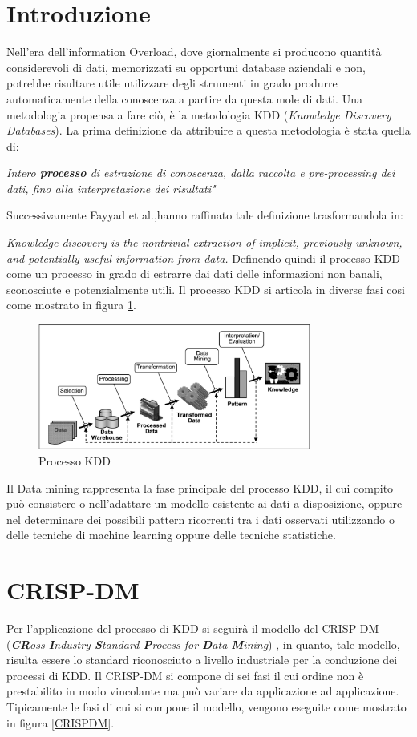 \section{Introduzione}
Nell'era dell'information Overload, dove giornalmente si producono quantità considerevoli di dati, memorizzati su opportuni database aziendali e non, potrebbe risultare utile utilizzare degli strumenti in grado produrre automaticamente della conoscenza a partire da questa mole di dati. Una metodologia propensa a fare ciò, è la metodologia KDD (\emph{Knowledge Discovery Databases}). 
La prima definizione da attribuire a questa metodologia è stata quella di:

\emph{Intero \textbf{processo} di estrazione di conoscenza, dalla raccolta e pre-processing dei dati, fino alla interpretazione dei risultati"\cite{DBLP:conf/kdd/1995}}


Successivamente Fayyad et al.,hanno raffinato tale definizione trasformandola in: 

\emph{Knowledge discovery is the nontrivial extraction of implicit, previously unknown, and potentially useful information from data.}
\cite{citeulike:1550195} Definendo quindi il processo KDD come un processo in grado di estrarre dai dati delle informazioni non banali, sconosciute e potenzialmente utili. Il processo KDD si articola in diverse fasi cosi come mostrato in figura \ref{kddprocess}.

\begin{figure}[hbtp]
\centering
\includegraphics[width=0.8\textwidth]{./images/kddprocess.png}
\caption{Processo KDD}
\label{kddprocess}
\end{figure}

Il Data mining rappresenta la fase principale del processo KDD, il cui compito può consistere o nell'adattare un modello esistente ai dati a disposizione, oppure nel determinare dei possibili pattern ricorrenti tra i dati osservati utilizzando o delle tecniche di machine learning oppure delle tecniche statistiche. 

\section{CRISP-DM}
Per l'applicazione del processo di KDD si seguirà il modello del CRISP-DM (\emph{\textbf{CR}oss \textbf{I}ndustry \textbf{S}tandard \textbf{P}rocess for \textbf{D}ata \textbf{M}ining})
\cite{wirth2000crisp}
, in quanto, tale modello, risulta essere lo standard riconosciuto a livello industriale per la conduzione dei processi di KDD.
Il CRISP-DM si compone di sei fasi il cui ordine non è prestabilito in modo vincolante ma può variare da applicazione ad applicazione. Tipicamente le fasi di cui si compone il modello, vengono eseguite come mostrato in figura \ref{CRISPDM}.

